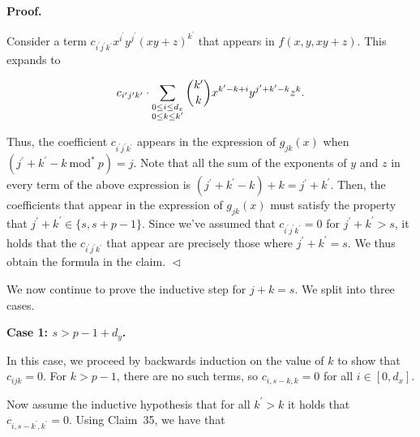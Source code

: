 \documentclass[10pt,a4paper]{article}
\begin{document}
\par\medskip\noindent\textbf{
\textbf{Proof}.}\par




Consider a term $c_{i^{\prime}j^{\prime}k^{\prime}}x^{i^{\prime}}y^{j^{\prime}}(xy+z)^{k^{\prime}}$ that appears in $f(x,y,xy+z)$. This expands to\par


\[\begin{gathered}
c_{i^{\prime}j^{\prime}k^{\prime}}\cdot\sum_{\begin{subarray}{c}0\leq i\leq d_{x}\\
0\leq k\leq k^{\prime}\end{subarray}}\binom{k^{\prime}}{k}x^{k^{\prime}-k+i}y^{j^{\prime}+k^{\prime}-k}z^{k}.
\end{gathered}\]


Thus, the coefficient $c_{i^{\prime}j^{\prime}k^{\prime}}$ appears in the expression of $g_{jk}(x)$ when $(j^{\prime}+k^{\prime}-k\ \text{mod}^{*}\ p)=j$. Note that all the sum of the exponents of $y$ and $z$ in every term of the above expression is $(j^{\prime}+k^{\prime}-k)+k=j^{\prime}+k^{\prime}$. Then, the coefficients that appear in the expression of $g_{jk}(x)$ must satisfy the property that $j^{\prime}+k^{\prime}\in\{s,s+p-1\}$. Since we’ve assumed that $c_{i^{\prime}j^{\prime}k^{\prime}}=0$ for $j^{\prime}+k^{\prime}>s$, it holds that the $c_{i^{\prime}j^{\prime}k^{\prime}}$ that appear are precisely those where $j^{\prime}+k^{\prime}=s$. We thus obtain the formula in the claim.
$\vartriangleleft$\par




We now continue to prove the inductive step for $j+k=s$. We split into three cases.\par





\par\medskip\noindent\textbf{Case 1: $s>p-1+d_{y}$.}\par




In this case, we proceed by backwards induction on the value of $k$ to show that $c_{ijk}=0$. For $k>p-1$, there are no such terms, so $c_{i,s-k,k}=0$ for all $i\in[0,d_{x}]$.\par




Now assume the inductive hypothesis that for all $k^{\prime}>k$ it holds that $c_{i,s-k^{\prime},k^{\prime}}=0$. Using Claim 35, we have that\par
\end{document}

